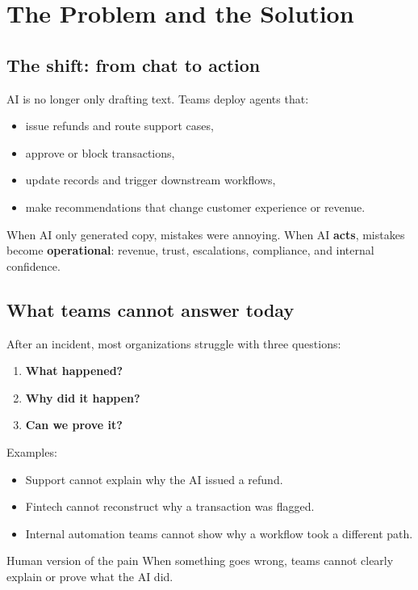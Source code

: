 \chapter{The Problem and the Solution}

\section{The shift: from chat to action}

AI is no longer only drafting text. Teams deploy agents that:

\begin{itemize}
  \item issue refunds and route support cases,
  \item approve or block transactions,
  \item update records and trigger downstream workflows,
  \item make recommendations that change customer experience or revenue.
\end{itemize}

When AI only generated copy, mistakes were annoying. When AI \textbf{acts}, mistakes become \textbf{operational}: revenue, trust, escalations, compliance, and internal confidence.

\section{What teams cannot answer today}

After an incident, most organizations struggle with three questions:

\begin{enumerate}
  \item \textbf{What happened?}
  \item \textbf{Why did it happen?}
  \item \textbf{Can we prove it?}
\end{enumerate}

Examples:

\begin{itemize}
  \item Support cannot explain why the AI issued a refund.
  \item Fintech cannot reconstruct why a transaction was flagged.
  \item Internal automation teams cannot show why a workflow took a different path.
\end{itemize}

\begin{warnbox}{Human version of the pain}
When something goes wrong, teams cannot clearly explain or prove what the AI did.
\end{warnbox}

